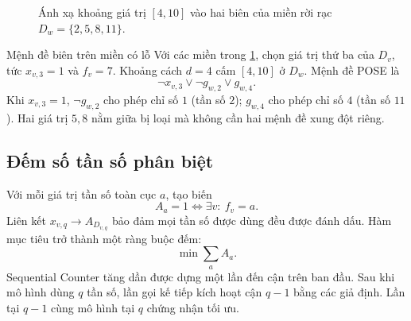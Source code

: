 \begin{figure}[tb]
\centering
{}
\caption{Ánh xạ khoảng giá trị \([4,10]\) vào hai biên của miền rời rạc
\(D_w=\{2,5,8,11\}\).}
\label{fig:fap-discrete-boundaries}
\end{figure}

\begin{workedexample}{Mệnh đề biên trên miền có lỗ}
Với các miền trong \cref{fig:fap-discrete-boundaries}, chọn giá trị thứ ba của
\(D_v\), tức \(x_{v,3}=1\) và \(f_v=7\). Khoảng cách \(d=4\) cấm
\([4,10]\) ở \(D_w\). Mệnh đề POSE là
\[
  \neg x_{v,3}\lor\neg g_{w,2}\lor g_{w,4}.
\]
Khi \(x_{v,3}=1\), \(\neg g_{w,2}\) cho phép chỉ số \(1\) (tần số \(2\));
\(g_{w,4}\) cho phép chỉ số \(4\) (tần số \(11\)). Hai giá trị \(5,8\) nằm
giữa bị loại mà không cần hai mệnh đề xung đột riêng.
\end{workedexample}

\subsection{Đếm số tần số phân biệt}

Với mỗi giá trị tần số toàn cục \(a\), tạo biến
\[
  A_a=1\iff
  \exists v:\ f_v=a.
\]
Liên kết \(x_{v,q}\rightarrow A_{D_{v,q}}\) bảo đảm mọi tần số được dùng đều
được đánh dấu. Hàm mục tiêu trở thành một ràng buộc đếm:
\[
  \min\sum_aA_a.
\]
Sequential Counter tăng dần được dựng một lần đến cận trên ban đầu. Sau khi mô hình
dùng \(q\) tần số, lần gọi kế tiếp kích hoạt cận \(q-1\) bằng các giả định. Lần
\UNSAT tại \(q-1\) cùng mô hình tại \(q\) chứng nhận tối ưu.

